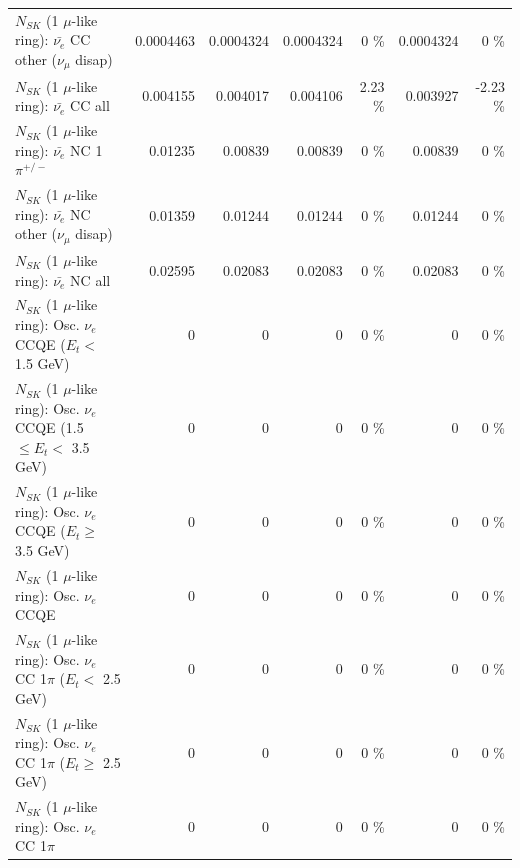 \begin{table}
\begin{tabular}{| l | r | r | r  r | r  r |}
          $N_{SK}$ (1 $\mu$-like ring): $\bar{\nu_e}$ CC other ($\nu_\mu$ disap) &       0.0004463 &       0.0004324 &       0.0004324 &        0 \%  &       0.0004324 &        0 \%  \\ 
                            $N_{SK}$ (1 $\mu$-like ring): $\bar{\nu_{e}}$ CC all &        0.004155 &        0.004017 &        0.004106 &     2.23 \%  &        0.003927 &    -2.23 \%  \\ 
\hline
                     $N_{SK}$ (1 $\mu$-like ring): $\bar{\nu_e}$ NC 1$\pi^{+/-}$ &         0.01235 &         0.00839 &         0.00839 &        0 \%  &         0.00839 &        0 \%  \\ 
          $N_{SK}$ (1 $\mu$-like ring): $\bar{\nu_e}$ NC other ($\nu_\mu$ disap) &         0.01359 &         0.01244 &         0.01244 &        0 \%  &         0.01244 &        0 \%  \\ 
                            $N_{SK}$ (1 $\mu$-like ring): $\bar{\nu_{e}}$ NC all &         0.02595 &         0.02083 &         0.02083 &        0 \%  &         0.02083 &        0 \%  \\ 
\hline
\hline
\hline
             $N_{SK}$ (1 $\mu$-like ring): Osc. $\nu_e$ CCQE ($E_{t} <$ 1.5 GeV) &               0 &               0 &               0 &        0 \%  &               0 &        0 \%  \\ 
    $N_{SK}$ (1 $\mu$-like ring): Osc. $\nu_e$ CCQE (1.5 $\leq E_{t} <$ 3.5 GeV) &               0 &               0 &               0 &        0 \%  &               0 &        0 \%  \\ 
          $N_{SK}$ (1 $\mu$-like ring): Osc. $\nu_e$ CCQE ($E_{t} \geq$ 3.5 GeV) &               0 &               0 &               0 &        0 \%  &               0 &        0 \%  \\ 
\hline
                                 $N_{SK}$ (1 $\mu$-like ring): Osc. $\nu_e$ CCQE &               0 &               0 &               0 &        0 \%  &               0 &        0 \%  \\ 
\hline
        $N_{SK}$ (1 $\mu$-like ring): Osc. $\nu_e$ CC 1$\pi$ ($E_{t} <$ 2.5 GeV) &               0 &               0 &               0 &        0 \%  &               0 &        0 \%  \\ 
     $N_{SK}$ (1 $\mu$-like ring): Osc. $\nu_e$ CC 1$\pi$ ($E_{t} \geq$ 2.5 GeV) &               0 &               0 &               0 &        0 \%  &               0 &        0 \%  \\ 
\hline
                            $N_{SK}$ (1 $\mu$-like ring): Osc. $\nu_e$ CC 1$\pi$ &               0 &               0 &               0 &        0 \%  &               0 &        0 \%  \\ 

\end{tabular}
\end{table}
